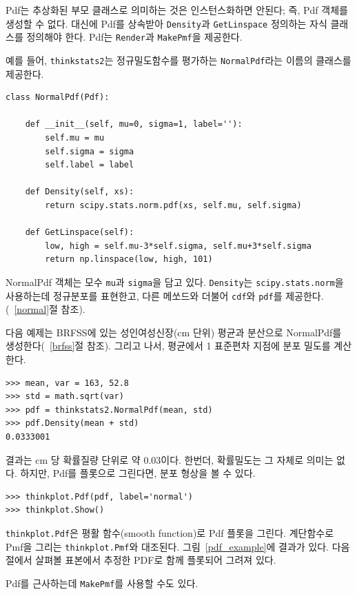 Pdf는 추상화된 부모 클래스로 의미하는 것은 인스턴스화하면 안된다; 즉, Pdf 객체를 생성할 수 없다. 대신에 Pdf를 상속받아 {\tt Density}과 {\tt GetLinspace} 정의하는 자식 클래스를 정의해야 한다. 
Pdf는 {\tt Render}과 {\tt MakePmf}을 제공한다.

예를 들어, {\tt thinkstats2}는 정규밀도함수를 평가하는 {\tt NormalPdf}라는 이름의 클래스를 제공한다.

\begin{verbatim}
class NormalPdf(Pdf):

    def __init__(self, mu=0, sigma=1, label=''):
        self.mu = mu
        self.sigma = sigma
        self.label = label

    def Density(self, xs):
        return scipy.stats.norm.pdf(xs, self.mu, self.sigma)

    def GetLinspace(self):
        low, high = self.mu-3*self.sigma, self.mu+3*self.sigma
        return np.linspace(low, high, 101)
\end{verbatim}

NormalPdf 객체는 모수 {\tt mu}과 {\tt sigma}을 담고 있다.
{\tt Density}는 {\tt scipy.stats.norm}을 사용하는데 정규분포를 표현한고, 
다른 메쏘드와 더불어 {\tt cdf}와 {\tt pdf}를 제공한다.(~\ref{normal}절 참조).

다음 예제는 BRFSS에 있는 성인여성신장(cm 단위) 평균과 분산으로 NormalPdf를 생성한다(~\ref{brfss}절 참조). 그리고 나서, 평균에서 1 표준편차 지점에 분포 밀도를 계산한다.

\begin{verbatim}
>>> mean, var = 163, 52.8
>>> std = math.sqrt(var)
>>> pdf = thinkstats2.NormalPdf(mean, std)
>>> pdf.Density(mean + std)
0.0333001
\end{verbatim}

결과는 cm 당 확률질량 단위로 약 0.03이다.
한번더, 확률밀도는 그 자체로 의미는 없다. 하지만, Pdf를 플롯으로 그린다면, 분포 형상을 볼 수 있다.

\begin{verbatim}
>>> thinkplot.Pdf(pdf, label='normal')
>>> thinkplot.Show()
\end{verbatim}

{\tt thinkplot.Pdf}은 평활 함수(smooth function)로 Pdf 플롯을 그린다. 
계단함수로 Pmf을 그리는 {\tt thinkplot.Pmf}와 대조된다.
그림~\ref{pdf_example}에 결과가 있다. 다음 절에서 살펴볼 표본에서 추정한 PDF로 함께 플롯되어 그려져 있다.

Pdf를 근사하는데 {\tt MakePmf}를 사용할 수도 있다.

